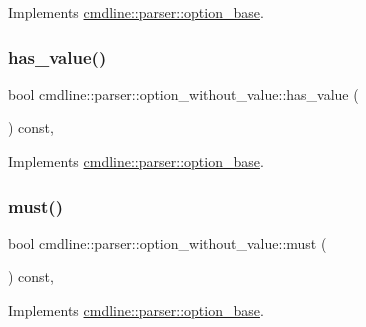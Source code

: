 Implements \mbox{\hyperlink{classcmdline_1_1parser_1_1option__base_aa948d89b57f4cd901bc20075ec277a04}{cmdline\+::parser\+::option\+\_\+base}}.

\mbox{\label{classcmdline_1_1parser_1_1option__without__value_abf481f9d4f936c8ab27fed99a747164f}} 
\subsubsection{\texorpdfstring{has\_value()}{has\_value()}}
{\footnotesize\ttfamily bool cmdline\+::parser\+::option\+\_\+without\+\_\+value\+::has\+\_\+value (\begin{DoxyParamCaption}{ }\end{DoxyParamCaption}) const\hspace{0.3cm}{\ttfamily [inline]}, {\ttfamily [virtual]}}



Implements \mbox{\hyperlink{classcmdline_1_1parser_1_1option__base_a6617c8ff8b2864e8cf3182ca76f7e7ac}{cmdline\+::parser\+::option\+\_\+base}}.

\mbox{\label{classcmdline_1_1parser_1_1option__without__value_a57b95fab703aba31c702697ab25c9316}} 
\subsubsection{\texorpdfstring{must()}{must()}}
{\footnotesize\ttfamily bool cmdline\+::parser\+::option\+\_\+without\+\_\+value\+::must (\begin{DoxyParamCaption}{ }\end{DoxyParamCaption}) const\hspace{0.3cm}{\ttfamily [inline]}, {\ttfamily [virtual]}}



Implements \mbox{\hyperlink{classcmdline_1_1parser_1_1option__base_aa12b58243643ca229983f5dcd5b0b82e}{cmdline\+::parser\+::option\+\_\+base}}.


